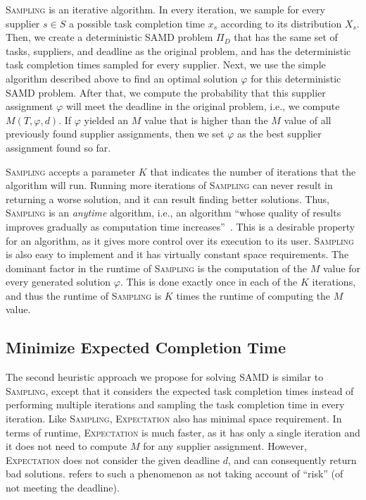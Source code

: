 \documentclass[letterpaper]{article} %
\newcommand{\samd}{\ac{SAMD}\xspace}
\newcommand{\sampling}{\textsc{Sampling}\xspace}
\newcommand{\expectation}{\textsc{Expectation}\xspace}
\begin{document}
\sampling is an iterative algorithm.
In every iteration, we sample for every supplier $s\in S$ a possible task completion time $x_s$ according to its distribution $X_s$.
Then, we create a deterministic \samd problem $\Pi_D$ that has the same set of tasks, suppliers, and deadline as the original problem, and has the deterministic task completion times sampled for every supplier. Next, we use the simple algorithm described above to find an optimal solution $\varphi$ for this deterministic \samd problem. After that, we compute the probability that this supplier assignment $\varphi$ will meet the deadline in the original problem, i.e., we compute $M(T,\varphi,d)$. If $\varphi$ yielded an $M$ value that is higher than the $M$ value of all previously found supplier assignments, then we set $\varphi$ as the best supplier assignment found so far.





\sampling accepts a parameter $K$ that indicates the number of iterations that the algorithm will run. Running more iterations of \sampling can never result in returning a worse solution, and it can result finding better solutions. Thus, \sampling is an \emph{anytime} algorithm, i.e., an algorithm
``whose quality of results improves gradually as computation time increases''~\cite{zilberstein1996using}. This is a desirable property for an algorithm, as it gives more control over its execution to its user.
 \sampling is also easy to implement and it has virtually constant space requirements. The dominant factor in the runtime of \sampling is the computation of the $M$ value for every generated solution $\varphi$. This is done exactly once in each of the $K$ iterations, and thus the runtime of \sampling is $K$ times the runtime of computing the $M$ value.







\subsection{Minimize Expected Completion Time}\label{sec:expect}


The second heuristic approach we propose for solving \samd is
similar to \sampling, except that it considers the expected task completion times instead of performing multiple iterations and sampling the task completion time in every iteration.
Like \sampling, \expectation also has minimal space requirement. In terms of runtime, \expectation is much faster, as it has only a single iteration and it does not need to compute $M$ for any supplier assignment. However, \expectation does not consider the given deadline $d$, and can consequently return bad solutions. \citeauthor{loui1983optimal} refers to such a phenomenon as not taking account of ``risk'' (of not meeting the deadline).
\end{document}
